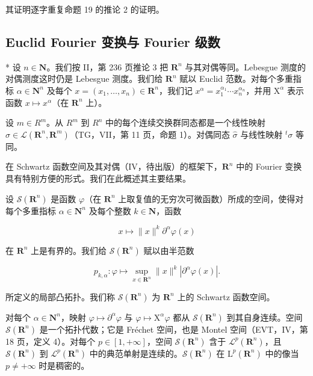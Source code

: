其证明逐字重复命题 19 的推论 2 的证明。

\subsection{Euclid Fourier 变换与 Fourier 级数}

* 设 \(n \in \mathbf{N}\)。我们按 II，第 236 页推论 3 把 \(\mathbf{R}^n\) 与其对偶等同。Lebesgue 测度的对偶测度这时仍是 Lebesgue 测度。我们给 \(\mathbf{R}^n\) 赋以 Euclid 范数。对每个多重指标 \(\alpha \in \mathbf{N}^n\) 及每个 \(x = (x_1, \ldots, x_n) \in \mathbf{R}^n\)，我们记 \(x^\alpha = x_1^{\alpha_1} \cdots x_n^{\alpha_n}\)，并用 \(\mathrm{X}^\alpha\) 表示函数 \(x \mapsto x^\alpha\)（在 \(\mathbf{R}^n\) 上）。

设 \(m \in R^{m}\)。从 \(R^{m}\) 到 \(R^{n}\) 中的每个连续交换群同态都是一个线性映射 \(\sigma \in \mathcal{L}(\mathbf{R}^{n}, \mathbf{R}^{m})\)（TG，VII，第 11 页，命题 1）。对偶同态 \(\widehat{\sigma}\) 与线性映射 \(^{t}\sigma\) 等同。

在 Schwartz 函数空间及其对偶（IV，待出版）的框架下，\(\mathbf{R}^n\) 中的 Fourier 变换具有特别方便的形式。我们在此概述其主要结果。

设 \(\mathcal{S}(\mathbf{R}^{n})\) 是函数 \(\varphi\)（在 \(\mathbf{R}^{n}\) 上取复值的无穷次可微函数）所成的空间，使得对每个多重指标 \(\alpha\in\mathbf{N}^{n}\) 及每个整数 \(k\in\mathbf{N}\)，函数

\[
x \mapsto \| x \| ^ {k} \partial^ {\alpha} \varphi (x)
\]

在 \(\mathbf{R}^{n}\) 上是有界的。我们给 \(\mathcal{S}(\mathbf{R}^{n})\) 赋以由半范数

\[
p _ {k, \alpha} \colon \varphi \mapsto \sup _ {x \in \mathbf {R} ^ {n}} \| x \| ^ {k} | \partial^ {\alpha} \varphi (x) |.
\]

所定义的局部凸拓扑。我们称 \(\mathcal{S}(\mathbf{R}^{n})\) 为 \(\mathbf{R}^{n}\) 上的 Schwartz 函数空间。

对每个 \(\alpha \in \mathbf{N}^n\)，映射 \(\varphi \mapsto \partial^\alpha \varphi\) 与 \(\varphi \mapsto \mathrm{X}^\alpha \varphi\) 都从 \(\mathcal{S}(\mathbf{R}^n)\) 到其自身连续。空间 \(\mathcal{S}(\mathbf{R}^n)\) 是一个拓扑代数；它是 Fréchet 空间，也是 Montel 空间（EVT，IV，第 18 页，定义 4）。对每个 \(p \in [1, +\infty]\)，空间 \(\mathcal{S}(\mathbf{R}^n)\) 含于 \(\mathcal{L}^p (\mathbf{R}^n)\)，且 \(\mathcal{S}(\mathbf{R}^n)\) 到 \(\mathcal{L}^p (\mathbf{R}^n)\) 中的典范单射是连续的。\(\mathcal{S}(\mathbf{R}^n)\) 在 \(\mathrm{L}^p (\mathbf{R}^n)\) 中的像当 \(p \neq +\infty\) 时是稠密的。


